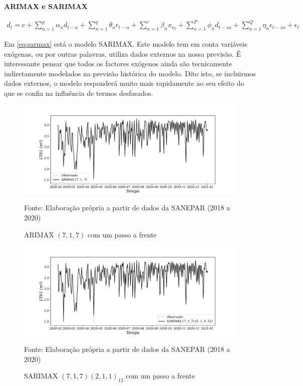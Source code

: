 \textbf{ARIMAX e SARIMAX}

\begin{eqnarray}
	d_t=c+\sum_{n=1}^p \alpha_n d_{t-n}+\sum_{n=1}^q \theta_n \epsilon_{t-n}+\sum_{n=1}^r \beta_n x_{n_t}+\sum_{n=1}^P \phi_n d_{t-s n}+\sum_{n=1}^Q \eta_n \epsilon_{t-s n}+\epsilon_t \label{eq:sarmax}
\end{eqnarray}

Em \eqref{eq:sarmax} está o modelo SARIMAX. Este modelo tem em conta variáveis exógenas, ou por outras palavras, utiliza dados externos na nossa previsão. É interessante pensar que todos os factores exógenos ainda são tecnicamente indiretamente modelados na previsão histórica do modelo. Dito isto, se incluirmos dados externos, o modelo responderá muito mais rapidamente ao seu efeito do que se confia na influência de termos desfasados.

\begin{figure}[H]
	\centering
	\caption{ARIMAX $(7,1,7)$ com um passo a frente}
	\label{fig:1-arimax}
	\includegraphics[width=1\linewidth]{Modelos/Figuras/1-ARIMAX}
	
	Fonte: Elaboração própria a partir de dados da SANEPAR (2018 a 2020)
\end{figure}

\begin{figure}[H]
	\centering
	\caption{SARIMAX $(7,1,7) (2,1,1)_{12}$ com um passo a frente}
	\label{fig:1-sarimax}
	\includegraphics[width=1\linewidth]{Modelos/Figuras/1-SARIMAX}
	
	Fonte: Elaboração própria a partir de dados da SANEPAR (2018 a 2020)
\end{figure}


